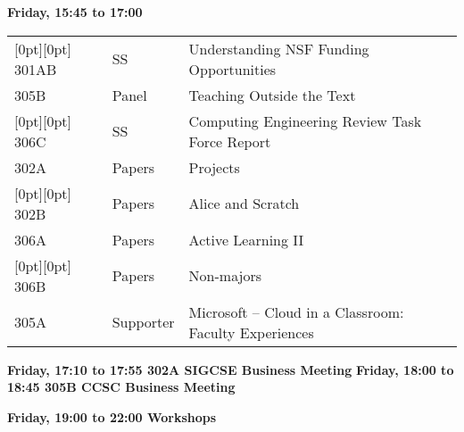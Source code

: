 \noindent
{\sffamily\bfseries Friday, 15:45 to 17:00}\newline\noindent
\begin{tabular*}{5in}{@{}p{0.5in}@{}p{0.75in}@{}p{3.75in}}

\rowcolor[gray]{0.9}[0pt][0pt] 301AB & SS & Understanding NSF Funding Opportunities \\

305B & Panel & Teaching Outside the Text \\

\rowcolor[gray]{0.9}[0pt][0pt] 306C & SS & Computing Engineering Review Task Force Report \\

302A & Papers & Projects \\

\rowcolor[gray]{0.9}[0pt][0pt] 302B & Papers & Alice and Scratch \\

306A & Papers & Active Learning II \\

\rowcolor[gray]{0.9}[0pt][0pt] 306B & Papers & Non-majors \\

305A & Supporter & Microsoft --  Cloud in a Classroom:  Faculty Experiences 
\end{tabular*}
\noindent
{\sffamily\bfseries Friday, 17:10 to 17:55 302A SIGCSE Business Meeting}\newline\noindent
\noindent
{\sffamily\bfseries Friday, 18:00 to 18:45 305B CCSC Business Meeting}\newline\noindent

\noindent
{\sffamily\bfseries Friday, 19:00 to 22:00 Workshops}\newline\noindent


